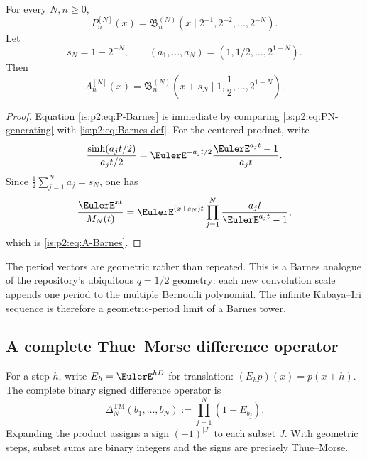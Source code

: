 \begin{theorem}
\label{is:p2:thm:Barnes-identification}
For every $N,n\ge0$,
\begin{equation}
 \boxed{
 P_n^{[N]}(x)
 =\mathfrak B_n^{(N)}
 \left(x\mid 2^{-1},2^{-2},\ldots,2^{-N}\right).
 }
 \label{is:p2:eq:P-Barnes}
\end{equation}
Let
\begin{equation}
 s_N=1-2^{-N},
 \qquad
 (a_1,\ldots,a_N)=(1,1/2,\ldots,2^{1-N}).
 \label{is:p2:eq:a-sN}
\end{equation}
Then
\begin{equation}
 \boxed{
 A_n^{[N]}(x)
 =\mathfrak B_n^{(N)}
 \left(x+s_N\mid1,\frac12,\ldots,2^{1-N}\right).
 }
 \label{is:p2:eq:A-Barnes}
\end{equation}
\end{theorem}

\begin{proof}
Equation \eqref{is:p2:eq:P-Barnes} is immediate by comparing
\eqref{is:p2:eq:PN-generating} with \eqref{is:p2:eq:Barnes-def}.  For the centered product, write
\[
 \frac{\sinh(a_jt/2)}{a_jt/2}
 =\EulerE^{-a_jt/2}\frac{\EulerE^{a_jt}-1}{a_jt}.
\]
Since $\frac12\sum_{j=1}^{N}a_j=s_N$, one has
\[
 \frac{\EulerE^{xt}}{M_N(t)}
 =\EulerE^{(x+s_N)t}\prod_{j=1}^{N}\frac{a_jt}{\EulerE^{a_jt}-1},
\]
which is \eqref{is:p2:eq:A-Barnes}.
\end{proof}

\begin{remark}
The period vectors are geometric rather than repeated.  This is a Barnes analogue of the
repository's ubiquitous $q=1/2$ geometry: each new convolution scale appends one period to the
multiple Bernoulli polynomial.  The infinite Kabaya--Iri sequence is therefore a geometric-period
limit of a Barnes tower.
\end{remark}

\subsection{A complete Thue--Morse difference operator}

For a step $h$, write $E_h=\EulerE^{hD}$ for translation: $(E_hp)(x)=p(x+h)$.  The complete binary
signed difference operator is
\begin{equation}
 \Delta_N^{\mathrm{TM}}(b_1,\ldots,b_N)
 :=\prod_{j=1}^{N}(1-E_{b_j}).
 \label{is:p2:eq:TM-operator}
\end{equation}
Expanding the product assigns a sign $(-1)^{|J|}$ to each subset $J$.  With geometric steps, subset
sums are binary integers and the signs are precisely Thue--Morse.

